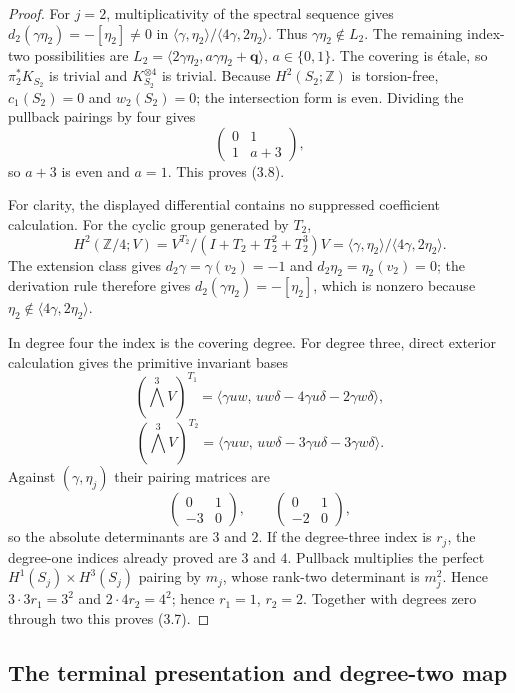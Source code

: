 \begin{proof}
For $j=2$, multiplicativity of the spectral sequence gives
$d_2(\gamma\eta_2)=-[\eta_2]\ne0$ in
$\langle\gamma,\eta_2\rangle/
\langle4\gamma,2\eta_2\rangle$.  Thus
$\gamma\eta_2\notin L_2$.  The remaining index-two possibilities are
$L_2=\langle2\gamma\eta_2,a\gamma\eta_2+\mathbf q\rangle$,
$a\in\{0,1\}$.  The covering is \'{e}tale, so
$\pi_2^*K_{S_2}$ is trivial and $K_{S_2}^{\otimes4}$ is trivial.
Because $H^2(S_2;\mathbb Z)$ is torsion-free, $c_1(S_2)=0$ and
$w_2(S_2)=0$; the intersection form is even.  Dividing the pullback
pairings by four gives
\[
\begin{pmatrix}0&1\\1&a+3\end{pmatrix},
\]
so $a+3$ is even and $a=1$.  This proves (3.8).

For clarity, the displayed differential contains no suppressed coefficient
calculation.  For the cyclic group generated by $T_2$,
\[
H^2(\mathbb Z/4;V)=V^{T_2}/(I+T_2+T_2^2+T_2^3)V
=\langle\gamma,\eta_2\rangle/
  \langle4\gamma,2\eta_2\rangle.
\]
The extension class gives $d_2\gamma=\gamma(v_2)=-1$ and
$d_2\eta_2=\eta_2(v_2)=0$; the derivation rule therefore gives
$d_2(\gamma\eta_2)=-[\eta_2]$, which is nonzero because
$\eta_2\notin\langle4\gamma,2\eta_2\rangle$.

In degree four the index is the covering degree.  For degree three, direct
exterior calculation gives the primitive invariant bases
\[
(\textstyle\bigwedge^3V)^{T_1}
=\langle\gamma uw,\,uw\delta-4\gamma u\delta-2\gamma w\delta\rangle,
\]
\[
(\textstyle\bigwedge^3V)^{T_2}
=\langle\gamma uw,\,uw\delta-3\gamma u\delta-3\gamma w\delta\rangle.
\]
Against $(\gamma,\eta_j)$ their pairing matrices are
\[
\begin{pmatrix}0&1\\-3&0\end{pmatrix},
\qquad
\begin{pmatrix}0&1\\-2&0\end{pmatrix},
\]
so the absolute determinants are $3$ and $2$.  If the degree-three
index is $r_j$, the degree-one indices already proved are $3$ and $4$.
Pullback multiplies the perfect $H^1(S_j)\times H^3(S_j)$ pairing by
$m_j$, whose rank-two determinant is $m_j^2$.  Hence
$3\cdot3r_1=3^2$ and $2\cdot4r_2=4^2$; hence $r_1=1$, $r_2=2$.
Together with degrees zero through two this proves (3.7).
\end{proof}

\subsection{The terminal presentation and degree-two map}

